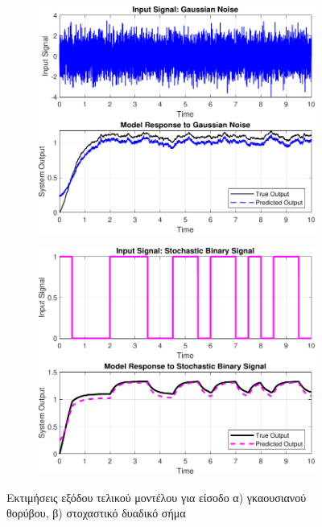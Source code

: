 \documentclass[a4paper,12pt]{article}
\begin{document}
\begin{figure}[htbp]
  \centering
  \begin{subfigure}[b]{0.45\textwidth}
    \centering
    \includegraphics[width=\textwidth]{plot/task2_final_model_vs_gaussian_noise.pdf}
    \caption{}
    \label{fig:task2_final_model_vs_gaussian_noise}
  \end{subfigure}
  \hfill
  \begin{subfigure}[b]{0.45\textwidth}
    \centering
    \includegraphics[width=\textwidth]{plot/task2_final_model_vs_stochastic_binary_signal.pdf}
    \caption{}
    \label{fig:task2_final_model_vs_stochastic_binary_signal}
  \end{subfigure}
  \caption{Εκτιμήσεις εξόδου τελικού μοντέλου για είσοδο α) γκαουσιανού θορύβου, β) στοχαστικό δυαδικό σήμα}
  \label{fig:task2_final_model_vs_stochastic_signal}
\end{figure}
\end{document}
